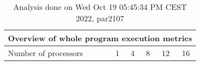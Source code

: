 \begin{table}[h]
\begin{center}
\begin{tabular}{|l|c|c|c|c|c|}
\hline
\multicolumn{6}{|c|}{Overview of whole program execution metrics} \\
\hline
\hline
Number of processors & 1 & 4 & 8 & 12 & 16 \\
\hline
\end{tabular}
\end{center}
\caption{ Analysis done on Wed Oct 19 05:45:34 PM CEST 2022, par2107}
\end{table}
